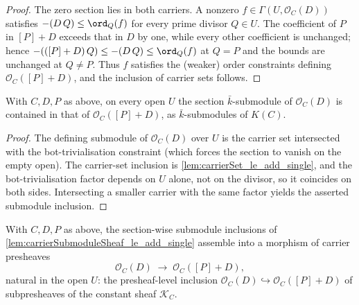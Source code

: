 \begin{proof}
  \leanok
  The zero section lies in both carriers. A nonzero
  \(f \in \Gamma(U, \mathcal O_C(D))\) satisfies \(-(D\,Q) \leq \ord_Q(f)\)
  for every prime divisor \(Q \in U\). The coefficient of \(P\) in
  \([P]+D\) exceeds that in \(D\) by one, while every other coefficient is
  unchanged; hence \(-(([P]+D)\,Q) \leq -(D\,Q) \leq \ord_Q(f)\) at \(Q = P\)
  and the bounds are unchanged at \(Q \neq P\). Thus \(f\) satisfies the
  (weaker) order constraints defining \(\mathcal O_C([P]+D)\), and the
  inclusion of carrier sets follows.
\end{proof}

\begin{lemma}

  \label{lem:carrierSubmoduleSheaf_le_add_single}
  With \(C, D, P\) as above, on every open \(U\) the section
  \(\bar k\)-submodule of \(\mathcal O_C(D)\) is contained in that of
  \(\mathcal O_C([P]+D)\), as \(\bar k\)-submodules of \(K(C)\).
\end{lemma}

\begin{proof}
  \leanok
  The defining submodule of \(\mathcal O_C(D)\) over \(U\) is the carrier set
  intersected with the bot-trivialisation constraint (which forces the
  section to vanish on the empty open). The carrier-set inclusion is
  \cref{lem:carrierSet_le_add_single}, and the bot-trivialisation factor
  depends on \(U\) alone, not on the divisor, so it coincides on both sides.
  Intersecting a smaller carrier with the same factor yields the asserted
  submodule inclusion.
\end{proof}

\begin{definition}

  \label{lem:carrierPresheaf_le_hom}
  With \(C, D, P\) as above, the section-wise submodule inclusions of
  \cref{lem:carrierSubmoduleSheaf_le_add_single} assemble into a morphism of
  carrier presheaves
  \[
    \mathcal O_C(D) \;\longrightarrow\; \mathcal O_C([P]+D),
  \]
  natural in the open \(U\): the presheaf-level inclusion
  \(\mathcal O_C(D) \hookrightarrow \mathcal O_C([P]+D)\) of subpresheaves of
  the constant sheaf \(\mathcal K_C\).
\end{definition}

